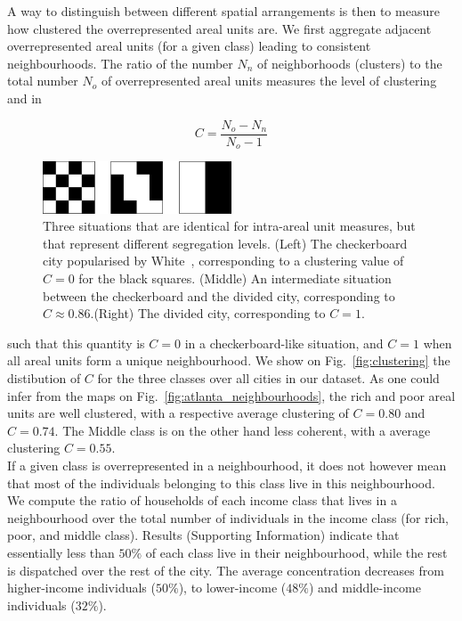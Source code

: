 A way to distinguish between different spatial arrangements is then to measure
how clustered the overrepresented areal units are. We first aggregate adjacent
overrepresented areal units (for a given class) leading to consistent
neighbourhoods. The ratio of the number $N_n$ of neighborhoods (clusters) to the
total number $N_o$ of overrepresented areal units measures the level of
clustering and in 

\begin{equation} 
    C = \frac{N_{o}-N_{n}}{N_{o}-1} 
\end{equation}

\begin{figure}[!h]
    \centering
    \includegraphics[width=0.5\textwidth]{./gfx/chapter-segregation/figure5.pdf}
    \caption{Three situations that are identical for intra-areal unit measures,
        but that represent different segregation levels. (Left) The checkerboard
        city popularised by White~\cite{White:1983}, corresponding to a
        clustering value of $C=0$ for the black squares. (Middle) An
        intermediate situation between the checkerboard and the divided city,
        corresponding to $C \approx 0.86$.(Right) The divided city, corresponding to
        $C=1$. \label{fig:checkerboard}} 
\end{figure}

such that this quantity is $C = 0$ in a checkerboard-like situation, and $C = 1$
when all areal units form a unique neighbourhood. We show on
Fig.~\ref{fig:clustering} the distibution of $C$ for the three classes over all
cities in our dataset. As one could infer from the maps on
Fig.~\ref{fig:atlanta_neighbourhoods}, the rich and poor areal units are well
clustered, with a respective average clustering of $C = 0.80$ and $C = 0.74$.
The Middle class is on the other hand less coherent, with a average clustering
$C = 0.55$.\\


If a given class is overrepresented in a neighbourhood, it does not however mean
that most of the individuals belonging to this class live in this neighbourhood.
We compute the ratio of households of each income class that lives in a
neighbourhood over the total number of individuals in the income class (for
rich, poor, and middle class).  Results (Supporting Information) indicate that
essentially less than $50\%$ of each class live in their neighbourhood, while
the rest is dispatched over the rest of the city. The average concentration
decreases from higher-income individuals ($50\%$), to lower-income ($48\%$) and
middle-income individuals ($32\%$).\\

